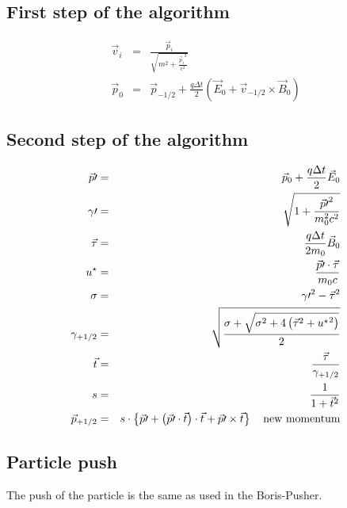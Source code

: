\documentclass[a4paper,12pt]{article}
\begin{document}
\subsection{First step of the algorithm}
\begin{eqnarray}
\vec v_{i} & = & \frac{\vec p_{i}}{\sqrt{m^2 + \frac{{\vec p_i}^2}{c^2}}} \\
\vec p_{0} & = & \vec p_{-1/2} + \frac{q \Delta t}{2} \left(  \vec E_{0} + \vec v_{-1/2} \times \vec B_{0} \right)
\end{eqnarray}

\subsection{Second step of the algorithm}
\begin{eqnarray}
\vec p \prime  & = & \vec p_{0} + \frac{q \Delta t}{2} \vec E_{0} \\
\gamma \prime & = & \sqrt{1 + \frac{{\vec p \prime}^2}{m_0^2 c^2 }} \\
\vec \tau & = & \frac{q \Delta t}{2 m_0} \vec B_{0} \\
u^{\star} & = & \frac{\vec p \prime \cdot \vec \tau}{m_0 c} \\
\sigma & = & {\gamma \prime }^2 - {\vec \tau}^2 \\
\gamma_{+1/2} & = & \sqrt{\frac{  \sigma + \sqrt{  \sigma^2 + 4 \left( {\vec \tau}^2 + {u^\star}^2 \right) } }{2}} \\
\vec t & = & \frac{\vec \tau}{\gamma_{+1/2}} \\
s & = & \frac{1}{1 + \vec t^2} \\
\vec p_{+1/2} & = & s \cdot \left\{   \vec p \prime + \left( \vec p \prime \cdot \vec t  \right) \cdot \vec t   + \vec p \prime \times \vec t  \right\} \mbox{\quad  new momentum}
\end{eqnarray}

\subsection{Particle push}
The push of the particle is the same as used in the Boris-Pusher.
\end{document}
